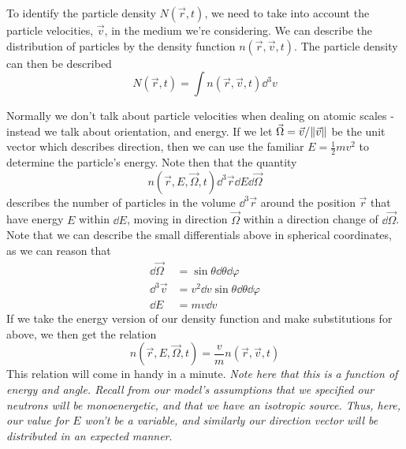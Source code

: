 To identify the particle density $N(\vec{r}, t)$, we need to take into account the particle velocities, $\vec{v}$, in the medium we're considering. 
We can describe the distribution of particles by the density function $n(\vec{r}, \vec{v}, t)$. The particle density can then be described
$$N(\vec{r}, t) = \int n(\vec{r}, \vec{v}, t) \dd^3 v$$

Normally we don't talk about particle velocities when dealing on atomic scales - instead we talk about orientation, and energy. 
If we let $\vec{\Omega} = \vec{v} / \norm{\vec{v}}$ be the unit vector which describes direction, then we can use the familiar $E = \frac{1}{2}mv^2$ 
to determine the particle's energy. Note then that the quantity
$$n(\vec{r}, E, \vec{\Omega}, t) \dd^3 \vec{r} \dd E \dd \vec{\Omega}$$
describes the number of particles in the volume $\dd^3 \vec{r}$ around the position $\vec{r}$ that have energy $E$ within $\dd E$, 
moving in direction $\vec{\Omega}$ within a direction change of $\dd \vec{\Omega}$. Note that we can describe the small differentials 
above in spherical coordinates, as we can reason that 
\begin{align*}
    \dd \vec{\Omega} &= \sin \theta \dd \theta \dd \varphi \\
    \dd^3 \vec{v} &= v^2 \dd v \sin \theta \dd \theta \dd \varphi \\
    \dd E &= mv \dd v
\end{align*}
If we take the energy version of our density function and make substitutions for above, we then get the relation
$$n(\vec{r}, E, \vec{\Omega}, t) = \frac{v}{m} n(\vec{r}, \vec{v}, t)$$
This relation will come in handy in a minute. \textit{Note here that this is a function of energy and angle. Recall from our 
model's assumptions that we specified our neutrons will be monoenergetic, and that we have an isotropic source. Thus, here, 
our value for $E$ won't be a variable, and similarly our direction vector will be distributed in an expected manner}.

